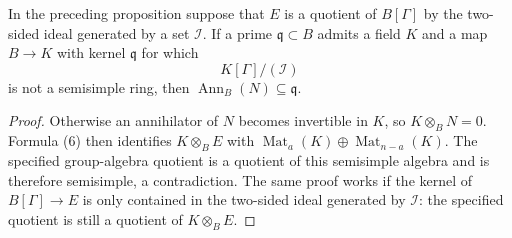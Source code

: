 \begin{srcorollary}
\label{cor:paired-nonss}
In the preceding proposition suppose that $E$ is a quotient of
$B[\Gamma]$ by the two-sided ideal generated by a set $\mathcal I$.
If a prime $\mathfrak q\subset B$ admits a field $K$ and a map
$B\to K$ with kernel $\mathfrak q$ for which
\[
       K[\Gamma]/(\mathcal I)
\]
is not a semisimple ring, then
$\operatorname{Ann}_B(N)\subseteq\mathfrak q$.
\end{srcorollary}
\begin{proof}
Otherwise an annihilator of $N$ becomes invertible in $K$, so
$K\otimes_BN=0$.  Formula (6) then identifies $K\otimes_BE$ with
$\operatorname{Mat}_a(K)\oplus\operatorname{Mat}_{n-a}(K)$.
The specified group-algebra quotient is a quotient of this
semisimple algebra and is therefore semisimple, a contradiction.
The same proof works if the kernel of $B[\Gamma]\to E$ is only
contained in the two-sided ideal generated by $\mathcal I$:
the specified quotient is still a quotient of $K\otimes_BE$.
\end{proof}


